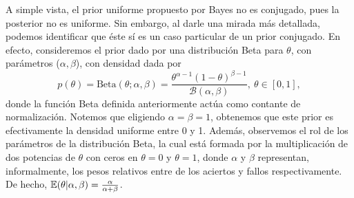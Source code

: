 A simple vista, el prior uniforme propuesto por Bayes no es conjugado, pues la posterior no es uniforme. Sin embargo, al darle una mirada más detallada, podemos identificar que éste sí es un caso particular de un prior conjugado. En efecto, consideremos el prior dado por una distribución Beta para $\theta$, con parámetros ($\alpha, \beta$), con densidad dada por 
\begin{equation}
	p(\theta) = \text{Beta}(\theta;\alpha,\beta) = \frac{\theta^{\alpha-1}(1-\theta)^{\beta-1}}{\mathcal{B}(\alpha, \beta)},\ \theta\in [0,1],
	\label{eq:distribucion_beta}
\end{equation}
donde la función Beta definida anteriormente actúa como contante de normalización. Notemos que eligiendo $\alpha=\beta=1$, obtenemos que este prior es efectivamente la densidad uniforme entre 0 y 1. Además, observemos el rol de los parámetros de la distribución Beta, la cual está formada por la multiplicación de dos potencias de $\theta$ con ceros en $\theta=0$ y $\theta=1$, donde $\alpha$ y $\beta$ representan, informalmente, los pesos relativos entre de los aciertos y fallos respectivamente. De hecho, $\operatorname{\mathbb{E}}(\theta|\alpha,\beta) = \frac{\alpha}{\alpha + \beta}$.

